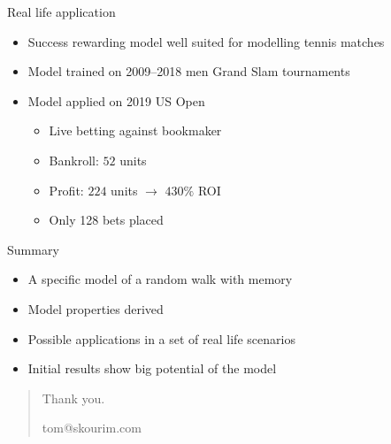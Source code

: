 \documentclass[american]{beamer}
\begin{document}
    \begin{frame}{Real life application}
        \begin{itemize}
            \item Success rewarding model well suited for modelling tennis matches
            \item Model trained on 2009--2018 men Grand Slam tournaments
            \item<2-> Model applied on 2019 US Open
            \begin{itemize}
                \item<3-> Live betting against bookmaker
                \item<4-> Bankroll: $52$ units
                \item<5-> Profit: $224$ units $\rightarrow$ $430\%$ ROI
                \item<6-> Only 128 bets placed
            \end{itemize}
        \end{itemize}
    \end{frame}

    \begin{frame}{Summary}
        \begin{itemize}
            \item A specific model of a random walk with memory
            \item Model properties derived
            \item Possible applications in a set of real life scenarios
            \item Initial results show big potential of the model
        \end{itemize}
    \end{frame}

    \begin{frame}[plain]
        \begin{quote}
            \begin{center}
                \huge{Thank you.}
            \end{center}
            \vspace{10mm}
            \begin{center}
                \large{tom@skourim.com}
            \end{center}
        \end{quote}
    \end{frame}
\end{document}
